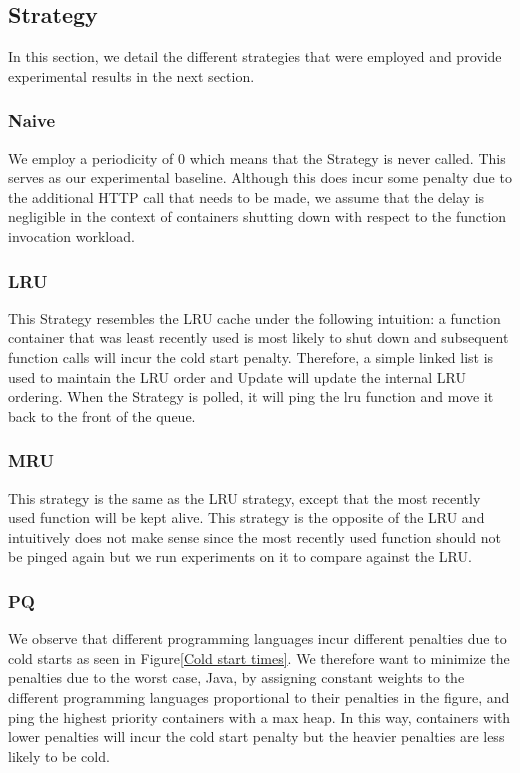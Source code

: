 \documentclass{article}
\begin{document}
\subsection{Strategy}\label{Strategy}

In this section, we detail the different strategies that were employed and provide experimental results in the next section.

\subsubsection{Naive}

We employ a periodicity of 0 which means that the Strategy is never called. This serves as our experimental baseline. Although this does incur some penalty due to the additional HTTP call that needs to be made, we assume that the delay is negligible in the context of containers shutting down with respect to the function invocation workload.

\subsubsection{LRU}

This Strategy resembles the LRU cache under the following intuition: a function container that was least recently used is most likely to shut down and subsequent function calls will incur the cold start penalty. Therefore, a simple linked list is used to maintain the LRU order and Update will update the internal LRU ordering. When the Strategy is polled, it will ping the lru function and move it back to the front of the queue.

\subsubsection{MRU}

This strategy is the same as the LRU strategy, except that the most recently used function will be kept alive. This strategy is the opposite of the LRU and intuitively does not make sense since the most recently used function should not be pinged again but we run experiments on it to compare against the LRU.

\subsubsection{PQ}

We observe that different programming languages incur different penalties due to cold starts as seen in Figure\ref*{Cold start times}. We therefore want to minimize the penalties due to the worst case, Java, by assigning constant weights to the different programming languages proportional to their penalties in the figure, and ping the highest priority containers with a max heap. In this way, containers with lower penalties will incur the cold start penalty but the heavier penalties are less likely to be cold.
\end{document}
